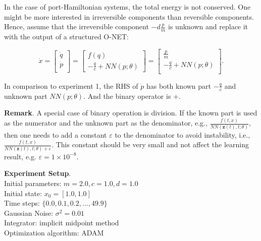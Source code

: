 \documentclass[
	parskip, 			   %
	twoside, 			   %
	DIV=14, 			   %
	BCOR=15.0mm, 		   %
	headsepline, 		   %
	open=right, 		   %
	captions=tableheading, %
	bibliography=totoc,    %
	numbers=noenddot       %
]{scrreprt}
\begin{document}
In the case of port-Hamiltonian systems, the total energy is not conserved. One might be more interested in irreversible components than reversible components. Hence, assume that the irreversible component $-d\frac{p}{m}$ is unknown and replace it with the output of a structured O-NET:

\begin{equation}
    \label{eq:structured_ODE_idho}
    \dot{x} =
    \begin{bmatrix}
    \dot{q}\\
    \dot{p}\\
    \end{bmatrix}
    =
    \begin{bmatrix}
    {f(q)}\\
    -\frac{q}{c} + {NN(p;\theta)}
    \end{bmatrix}
    =
    \begin{bmatrix}
    \frac{p}{m}\\
    -\frac{q}{c} + {NN(p;\theta)}\\
    \end{bmatrix}.
\end{equation}

In comparison to experiment 1, the RHS of $\dot{p}$ has both known part $-\frac{q}{c}$ and unknown part $NN(p;\theta)$. And the binary operator is $+$.

\textbf{Remark}. A special case of binary operation is division. If the known part is used as the numerator and the unknown part as the denominator, e.g., $\frac{f(t, x)}{NN(\mathbf{z}(t), t; \theta)}$, then one needs to add a constant $\varepsilon$ to the denominator to avoid instability, i.e., $\frac{f(t, x)}{NN(\mathbf{z}(t), t; \theta) + \varepsilon}$. This constant should be very small and not affect the learning result, e.g. $\varepsilon = 1 \times 10^{-8}$.

\textbf{Experiment Setup}.\\
Initial parameters: $m = 2.0, c = 1.0, d = 1.0$\\
Initial state: $x_0 = [1.0, 1.0]$\\
Time steps: $\{ 0.0, 0.1, 0.2, ..., 49.9 \}$\\
Gaussian Noise: $\sigma^2 = 0.01$\\
Integrator: implicit midpoint method\\
Optimization algorithm: ADAM
\end{document}
